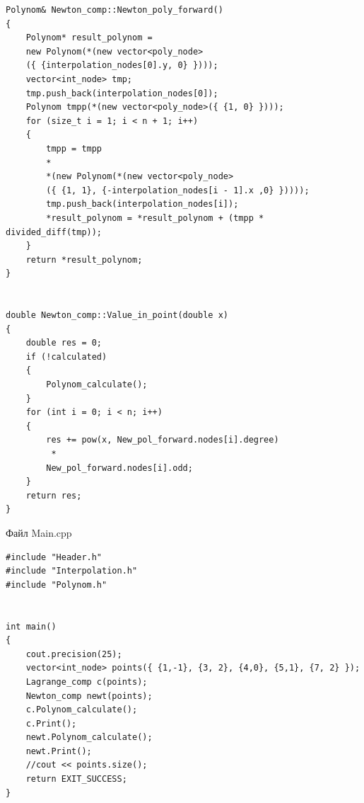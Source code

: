 \documentclass[14pt,a4paper,titlepage]{extarticle}
\begin{document}
\begin{verbatim}
Polynom& Newton_comp::Newton_poly_forward()
{
	Polynom* result_polynom = 
	new Polynom(*(new vector<poly_node>
	({ {interpolation_nodes[0].y, 0} })));
	vector<int_node> tmp;
	tmp.push_back(interpolation_nodes[0]);
	Polynom tmpp(*(new vector<poly_node>({ {1, 0} })));
	for (size_t i = 1; i < n + 1; i++)
	{
		tmpp = tmpp 
		* 
		*(new Polynom(*(new vector<poly_node>
		({ {1, 1}, {-interpolation_nodes[i - 1].x ,0} }))));
		tmp.push_back(interpolation_nodes[i]);
		*result_polynom = *result_polynom + (tmpp * divided_diff(tmp));
	}
	return *result_polynom;
}


double Newton_comp::Value_in_point(double x)
{
	double res = 0;
	if (!calculated)
	{
		Polynom_calculate();
	}
	for (int i = 0; i < n; i++)
	{
		res += pow(x, New_pol_forward.nodes[i].degree)
		 *
		New_pol_forward.nodes[i].odd;
	}
	return res;
}
\end{verbatim}
Файл Main.cpp
\begin{verbatim}
#include "Header.h"
#include "Interpolation.h"
#include "Polynom.h"


int main()
{
	cout.precision(25);
	vector<int_node> points({ {1,-1}, {3, 2}, {4,0}, {5,1}, {7, 2} });
	Lagrange_comp c(points);
	Newton_comp newt(points);
	c.Polynom_calculate();
	c.Print();
	newt.Polynom_calculate();
	newt.Print();
	//cout << points.size();
	return EXIT_SUCCESS;
}
\end{verbatim}
\end{document}
